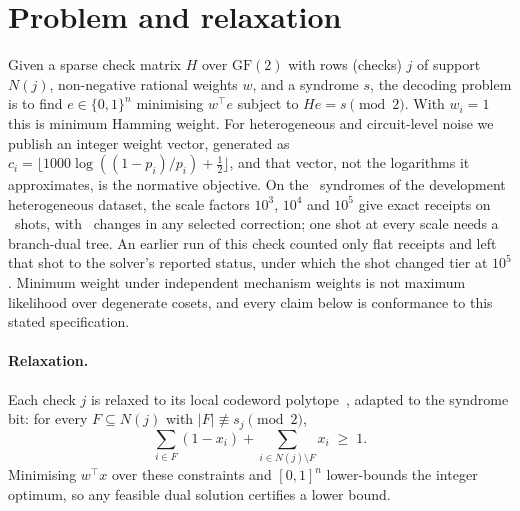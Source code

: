 \documentclass[aps,pra,twocolumn,superscriptaddress,nofootinbib,longbibliography,floatfix]{revtex4-2}
\newcommand{\GF}{\mathrm{GF}(2)}
\begin{document}
\section{Problem and relaxation}
\label{sec:problem}

Given a sparse check matrix $H$ over $\GF$ with rows (checks) $j$ of support $N(j)$, non-negative rational weights $w$, and a syndrome $s$, the decoding problem is to find $e\in\{0,1\}^n$ minimising $w^\top e$ subject to $He=s \pmod 2$. With $w_i=1$ this is minimum Hamming weight. For heterogeneous and circuit-level noise we publish an integer weight vector, generated as $c_i=\lfloor 1000\log((1-p_i)/p_i)+\tfrac12\rfloor$, and that vector, not the logarithms it approximates, is the normative objective. On the \ScaleTreesShots\ syndromes of the development heterogeneous dataset, the scale factors $10^3$, $10^4$ and $10^5$ give exact receipts on \ScaleTreesCertified\ shots, with \ScaleTreesSupportChanges\ changes in any selected correction; one shot at every scale needs a branch-dual tree. An earlier run of this check counted only flat receipts and left that shot to the solver's reported status, under which the shot changed tier at $10^5$. Minimum weight under independent mechanism weights is not maximum likelihood over degenerate cosets, and every claim below is conformance to this stated specification.

\paragraph*{Relaxation.} Each check $j$ is relaxed to its local codeword polytope~\cite{feldman2005lp}, adapted to the syndrome bit: for every $F\subseteq N(j)$ with $|F|\not\equiv s_j \pmod 2$,
\begin{equation}
\sum_{i\in F}(1-x_i)+\sum_{i\in N(j)\setminus F}x_i\;\ge\;1 .
\label{eq:facet}
\end{equation}
Minimising $w^\top x$ over these constraints and $[0,1]^n$ lower-bounds the integer optimum, so any feasible dual solution certifies a lower bound.
\end{document}
